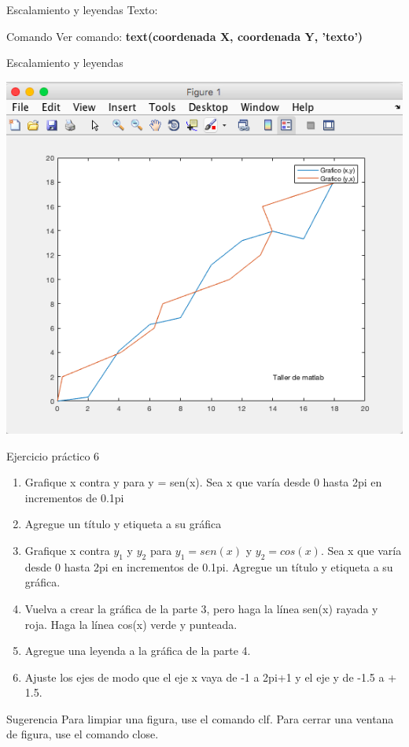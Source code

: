 \documentclass{bredelebeamer}
\begin{document}
\begin{frame}{Escalamiento y leyendas}
Texto:\\
\begin{exampleblock}{Comando}
Ver comando: \textbf{text(coordenada X, coordenada Y, 'texto')}
\end{exampleblock}
\end{frame}

\begin{frame}{Escalamiento y leyendas}
\begin{center}
\includegraphics[scale=0.35]{images/pantalla19.png}
\end{center}
\end{frame}

\begin{frame}{Ejercicio práctico 6}
\begin{enumerate}
\item Grafique x contra y para y = sen(x). Sea x que varía desde 0 hasta 2pi en incrementos de 0.1pi
\item Agregue un título y etiqueta a su gráfica
\item Grafique x contra $y_1$ y $y_2$ para $y_1 = sen(x)$ y $y_2 = cos(x)$. Sea x que varía desde 0 hasta 2pi en incrementos de 0.1pi. Agregue un título y etiqueta a su gráfica.
\item Vuelva a crear la gráfica de la parte 3, pero haga la línea sen(x) rayada y roja. Haga la línea cos(x) verde y punteada.
\item Agregue una leyenda a la gráfica de la parte 4.
\item Ajuste los ejes de modo que el eje x vaya de -1 a 2pi+1 y el eje y de -1.5 a + 1.5.
\end{enumerate}
\begin{block}{Sugerencia}
Para limpiar una figura, use el comando clf. Para cerrar una ventana de figura, use el comando close.
\end{block}
\end{frame}
\end{document}
